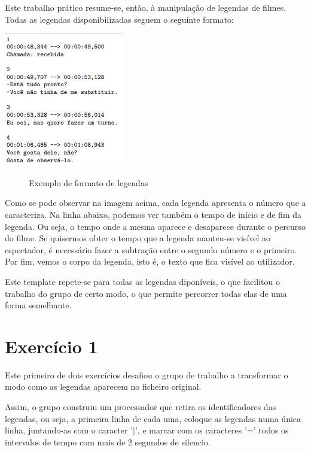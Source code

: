 \documentclass[a4paper]{article}
\begin{document}
Este trabalho prático resume-se, então, à manipulação de legendas de filmes. 
Todas as legendas disponibilizadas seguem o seguinte formato:

\begin{center}
	\includegraphics{1}
	\begin{figure}[!h]
	\caption{Exemplo de formato de legendas}
	\end{figure}
\end{center}

Como se pode observar na imagem acima, cada legenda apresenta o número que a caracteriza.
Na linha abaixo, podemos ver também o tempo de início e de fim da legenda. Ou seja, o tempo onde a mesma aparece e desaparece durante o percurso do filme. Se quisermos obter o tempo que a legenda manteu-se visível ao espectador, é necessário fazer a subtração entre o segundo número e o primeiro.
Por fim, vemos o corpo da legenda, isto é, o texto que fica visível ao utilizador.

Este template repete-se para todas as legendas diponíveis, o que facilitou o trabalho do grupo de certo modo, o que permite percorrer todas elas de uma forma semelhante.

\vspace{75px}
\section{Exercício 1}
\label{sec:ex1}

Este primeiro de dois exercícios desafiou o grupo de trabalho a transformar o modo como as legendas aparecem no ficheiro original.

Assim, o grupo construiu um processador que retira os identificadores das legendas, ou seja, a primeira linha de cada uma, coloque as legendas numa única linha, juntando-as com o caracter '$|$', e marcar com os caracteres '=' todos os intervalos de tempo com mais de 2 segundos de silencio.
\end{document}
